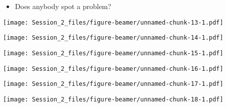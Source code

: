\documentclass[
  ignorenonframetext,
  aspectratio=169,
]{beamer}
\providecommand{\tightlist}{%
  \setlength{\itemsep}{0pt}\setlength{\parskip}{0pt}}
\begin{document}
\begin{frame}[fragile]
\normalsize

\begin{itemize}
\tightlist
\item
  Does anybody spot a problem?
\end{itemize}
\end{frame}

\begin{frame}
\scriptsize\texttt{[image: Session\_2\_files/figure-beamer/unnamed-chunk-13-1.pdf]}
\normalsize
\end{frame}

\begin{frame}
\scriptsize\texttt{[image: Session\_2\_files/figure-beamer/unnamed-chunk-14-1.pdf]}
\normalsize
\end{frame}

\begin{frame}
\scriptsize\texttt{[image: Session\_2\_files/figure-beamer/unnamed-chunk-15-1.pdf]}
\normalsize
\end{frame}

\begin{frame}
\scriptsize\texttt{[image: Session\_2\_files/figure-beamer/unnamed-chunk-16-1.pdf]}
\normalsize
\end{frame}

\begin{frame}
\scriptsize\texttt{[image: Session\_2\_files/figure-beamer/unnamed-chunk-17-1.pdf]}
\normalsize
\end{frame}

\begin{frame}
\scriptsize\texttt{[image: Session\_2\_files/figure-beamer/unnamed-chunk-18-1.pdf]}
\normalsize
\end{frame}
\end{document}
